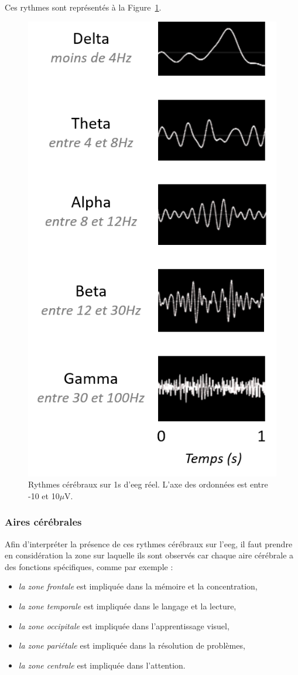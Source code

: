 Ces rythmes sont représentés à la Figure~\ref{Figure:introduction_EEG_waves}.

\begin{figure}[h!]
  \centering
	\includegraphics[width=0.5\linewidth]{figures/chapter-1/introduction-EEG-waves} 
  \caption[Rythmes cérébraux sur 1s d'\gls{eeg} réel.]{Rythmes cérébraux sur 1s d'\gls{eeg} réel. L'axe des ordonnées est entre -10 et 10$\mu$V.}
  \label{Figure:introduction_EEG_waves}
\end{figure}

\subsubsection{Aires cérébrales}

Afin d'interpréter la présence de ces rythmes cérébraux sur l'\gls{eeg}, il faut prendre en considération la zone sur laquelle ils sont observés 
car chaque aire cérébrale a des fonctions spécifiques, comme par exemple \citep{Marzbani2016} :
\begin{itemize}
\item \emph{la zone frontale} est impliquée dans la mémoire et la concentration,
\item \emph{la zone temporale} est impliquée dans le langage et la lecture,
\item \emph{la zone occipitale }est impliquée dans l'apprentissage visuel,
\item \emph{la zone pariétale} est impliquée dans la résolution de problèmes,
\item \emph{la zone centrale} est impliquée dans l'attention.
\end{itemize}

